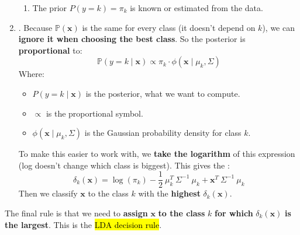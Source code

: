 \begin{enumerate}
\begin{enumerate}
        \item The prior $P\left(y = k\right) = \pi_{k}$ is known or estimated from the data.
    \end{enumerate}


    \item {}. Because $\mathbb{P}\left(\mathbf{x}\right)$ is the same for every class (it doesn't depend on $k$), we can \textbf{ignore it when choosing the best class}. So the posterior is \textbf{proportional} to:
    \begin{equation*}
        \mathbb{P}\left(y = k \mid \mathbf{x}\right) \propto \pi_k \cdot \phi\left(\mathbf{x} \mid \mu_k, \Sigma\right)
    \end{equation*}
    Where:
    \begin{itemize}
        \item $P\left(y = k \mid \mathbf{x}\right)$ is the posterior, what we want to compute.
        \item $\propto$ is the proportional symbol.
        \item $\phi(\mathbf{x} \mid \mu_k, \Sigma)$ is the Gaussian probability density for class $k$.
    \end{itemize}
    To make this easier to work with, we \textbf{take the logarithm} of this expression (log doesn't change which class is biggest). This gives the :
    \begin{equation}
        \delta_{k}\left(\mathbf{x}\right) = \log\left(\pi_{k}\right) - \frac{1}{2} \: \mu_{k}^{T} \: \Sigma^{-1} \: \mu_{k} + \mathbf{x}^{T} \: \Sigma^{-1} \: \mu_{k}
    \end{equation}
    Then we classify $\mathbf{x}$ to the class $k$ with the \textbf{highest} $\delta_{k}\left(\mathbf{x}\right)$.
\end{enumerate}
The final rule is that we need to \textbf{assign} $\mathbf{x}$ \textbf{to the class} $k$ \textbf{for which} $\delta_{k}\left(\mathbf{x}\right)$ \textbf{is the largest}. This is the \hl{LDA decision rule}.

